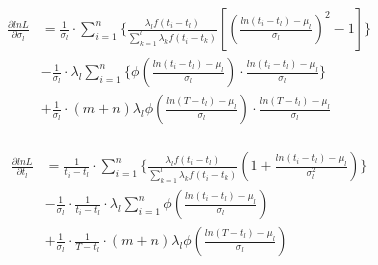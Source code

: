 \begin{eqnarray}
\label{eq:gradSigma}
\begin{split}
\frac{\partial lnL}{\partial \sigma_l} & = \frac{1}{\sigma_l} \cdot \sum_{i=1}^{n}\{\frac{\lambda_l f(t_i-t_l)}{\sum_{k=1}^{l} \lambda_k f(t_i-t_k)}[(\frac{ln(t_i-t_l)-\mu_l}{\sigma_l})^2-1]\} \\
& -\frac{1}{\sigma_l} \cdot \lambda_l\sum_{i=1}^{n}\{\phi(\frac{ln(t_i-t_l)-\mu_l}{\sigma_l}) \cdot \frac{ln(t_i-t_l)-\mu_l}{\sigma_l}\} \\
& + \frac{1}{\sigma_l} \cdot (m+n)\lambda_l \phi(\frac{ln(T-t_l)-\mu_l}{\sigma_l}) \cdot \frac{ln(T-t_l)-\mu_l}{\sigma_l}
\end{split}
\end{eqnarray}

\begin{eqnarray}
\label{eq:gradT}
\begin{split}
\frac{\partial lnL}{\partial t_l} &= \frac{1}{t_i-t_l} \cdot \sum_{i=1}^{n}\{ \frac{\lambda_l f(t_i-t_l)}{\sum_{k=1}^l\lambda_kf(t_i-t_k)}(1+\frac{ln(t_i-t_l)-\mu_l}{\sigma_l^2}) \} \\
& -\frac{1}{\sigma_l} \cdot \frac{1}{t_i-t_l}\cdot \lambda_l\sum_{i=1}^{n} \phi(\frac{ln(t_i-t_l)-\mu_l}{\sigma_l}) \\
& +\frac{1}{\sigma_l}\cdot \frac{1}{T-t_l}\cdot (m+n)\lambda_l\phi(\frac{ln(T-t_l)-\mu_l}{\sigma_l})
\end{split}
\end{eqnarray}